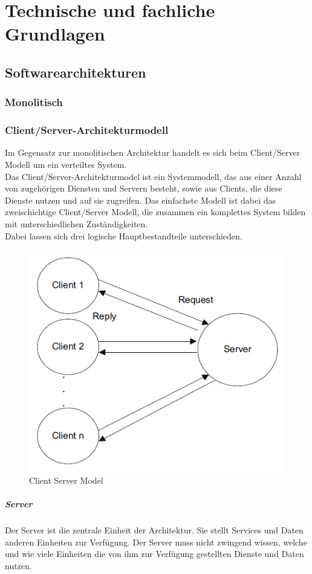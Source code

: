 \chapter{Technische und fachliche Grundlagen} 
\label{ch:grundlagen} 

\section{Softwarearchitekturen}
	\subsection{Monolitisch}
	\subsection{Client/Server-Architekturmodell}
	Im Gegensatz zur monolitischen Architektur handelt es sich beim Client/Server Modell um ein verteiltes System.\\
	Das Client/Server-Architekturmodel ist ein Systemmodell, das aus einer Anzahl von zugehörigen Diensten und Servern besteht, sowie aus Clients, die diese Dienste nutzen und auf sie zugreifen. Das einfachste Modell ist dabei das zweischichtige Client/Server Modell, die zusammen ein komplettes System bilden mit unterschiedlichen Zuständigkeiten. \\
	Dabei lassen sich drei logische Hauptbestandteile unterschieden.
	
	\begin{figure}[h]
		\centering
		\includegraphics[width=0.7\linewidth]{images/Clients-und-Server}
		\caption{Client Server Model}
		\label{fig:client-server}
	\end{figure}
	
	\paragraph{Server}
	Der Server ist die zentrale Einheit der Architektur. Sie stellt Services und Daten anderen Einheiten zur Verfügung. Der Server muss nicht zwingend wissen, welche und wie viele Einheiten die von ihm zur Verfügung gestellten Dienste und Daten nutzen.
	
